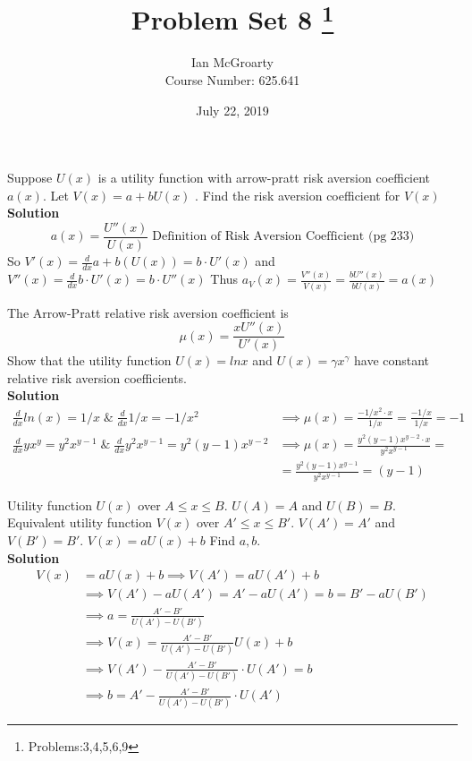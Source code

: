 \documentclass[12pt]{article}
\title{Problem Set 8 \thanks{Problems:3,4,5,6,9}}
\author{Ian McGroarty \\
	Course Number: 625.641}
\date{July 22, 2019}
\newenvironment{problem}[3][Problem]{\begin{trivlist}
\item[\hskip \labelsep {\bfseries #1}\hskip \labelsep {\bfseries #2.}]}{\end{trivlist}}
\newcommand{\ddx}{\frac{d}{dx}}
\begin{document}
\maketitle
\newpage
\begin{problem}{3 (risk aversion)}.  Suppose $U(x)$ is a utility function with arrow-pratt risk aversion coefficient $a(x)$. Let $V(x) = a + bU(x)$ . Find the risk aversion coefficient for $V(x)$\\
\textbf{Solution} $$ a(x) = \frac{U''(x)}{U(x)} \; \text{Definition of Risk Aversion Coefficient (pg 233)}$$
So $V'(x) = \ddx a + b(U(x)) = b\cdot U'(x)$ and $V''(x) = \ddx  b\cdot U'(x) =  b\cdot U''(x)$ Thus $a_V(x) = \frac{V''(x)}{V(x)} = \frac{bU''(x)}{bU(x)} = a(x)$
\end{problem}

\begin{problem}{4 Relative Risk Aversion}. The Arrow-Pratt relative risk aversion coefficient is $$ \mu (x) = \frac{xU''(x)}{U'(x)}$$ Show that the utility function $U(x) = ln x$ and $U(x) = \gamma x^\gamma $ have constant relative risk aversion coefficients. \\
\textbf{Solution} 
\begin{align*}
 \ddx ln(x) = 1/x \; \& \; \ddx 1/x = -1/x^2 &\implies \mu (x) = \frac{-1/x^2 \cdot x}{1/x} = \frac{-1/x}{1/x} = -1  \\
 \ddx yx^y = y^2x^{y-1} \; \& \; \ddx  y^2x^{y-1} =  y^2(y-1)x^{y-2} &\implies \mu (x) = \frac{ y^2(y-1)x^{y-2} \cdot x}{y^2x^{y-1} } = \\
  &= \frac{ y^2(y-1)x^{y-1}}{y^2x^{y-1} } = (y-1) 
\end{align*}
\end{problem}

\begin{problem}{(5) Equivalence}: Utility function $U(x)$ over $A\leq x \leq B $. $U(A)=A$ and $U(B) = B$. 
			Equivalent utility function $V(x)$ over $A'\leq x \leq B' $. $V(A')=A'$ and $V(B') = B'$.
$V(x) = aU(x) +b $ Find $a,b$. \\
\textbf{Solution} \\
\begin{align*}
V(x) &= aU(x) + b \implies V(A') = aU(A') + b \\
&\implies V(A')-aU(A') = A' - aU(A')= b =  B'-aU(B') \\
&\implies a = \frac{A' - B'}{U(A') - U(B')} \\
&\implies V(x) =  \frac{A' - B'}{U(A') - U(B')}U(x) + b \\
&\implies V(A')- \frac{A' - B'}{U(A') - U(B')}\cdot U(A') = b \\
&\implies b = A'- \frac{A' - B'}{U(A') - U(B')}\cdot U(A')
\end{align*}

			
\end{problem}
\end{document}
